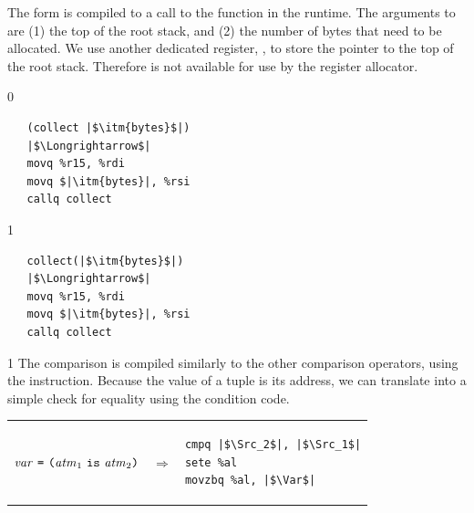 \documentclass[7x10]{TimesAPriori_MIT}%
\def\racketEd{0}
\def\pythonEd{1}
\def\edition{1}
\newcommand{\pythonColor}[0]{}
\numberwithin{theorem}{chapter}
\numberwithin{definition}{chapter}
\numberwithin{equation}{chapter}
\begin{document}
%
The  form is compiled to a call to the 
function in the runtime. The arguments to  are (1) the
top of the root stack, and (2) the number of bytes that need to be
allocated.  We use another dedicated register, , to store
the pointer to the top of the root stack. Therefore  is not
available for use by the register allocator.
%
{\if\edition\racketEd
\begin{lstlisting}
   (collect |$\itm{bytes}$|)
   |$\Longrightarrow$|
   movq %r15, %rdi
   movq $|\itm{bytes}|, %rsi
   callq collect
\end{lstlisting}
\fi}
{\if\edition\pythonEd\pythonColor    
\begin{lstlisting}
   collect(|$\itm{bytes}$|)
   |$\Longrightarrow$|
   movq %r15, %rdi
   movq $|\itm{bytes}|, %rsi
   callq collect
\end{lstlisting}
\fi}

{\if\edition\pythonEd\pythonColor    
The  comparison is compiled similarly to the other comparison
operators, using the  instruction. Because the value of a
tuple is its address, we can translate  into a simple check
for equality using the  condition code. \\
\begin{tabular}{lll}
\begin{minipage}{0.4\textwidth}
$\mathit{var}~\texttt{=}~ \texttt{(}\mathit{atm}_1~\texttt{is}~\mathit{atm}_2 \texttt{)}$ 
\end{minipage}
&
$\Rightarrow$
&
\begin{minipage}{0.4\textwidth}
\begin{lstlisting}
cmpq |$\Src_2$|, |$\Src_1$|
sete %al
movzbq %al, |$\Var$|
\end{lstlisting}
\end{minipage}
\end{tabular}
\fi}


\newcommand{\GrammarXGlobal}{
\begin{array}{lcl}
  \Instr &::=& \key{andq}~\Src\key{,}~\Dst
          \MID \key{sarq}~\Src\key{,}~\Dst \\
  \Src &::=& \itm{label} \key{(\%rip)} 
\end{array}
}

\newcommand{\ASTXGlobalRacket}{
\begin{array}{lcl}
  \Instr &::=& \BININSTR{\scode{andq}}{\Src}{\Dst} \MID
               \BININSTR{\scode{sarq}}{\Src}{\Dst} \\
  \Src &::=&  \GLOBAL{\itm{label}} 
\end{array}
}
\end{document}
